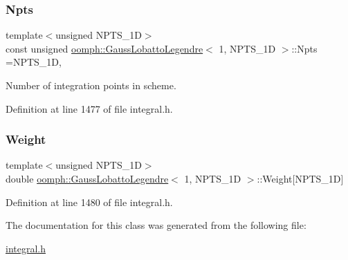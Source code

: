 \subsubsection{\texorpdfstring{Npts}{Npts}}
{\footnotesize\ttfamily template$<$unsigned N\+P\+T\+S\+\_\+1D$>$ \\
const unsigned \hyperlink{classoomph_1_1GaussLobattoLegendre}{oomph\+::\+Gauss\+Lobatto\+Legendre}$<$ 1, N\+P\+T\+S\+\_\+1D $>$\+::Npts =N\+P\+T\+S\+\_\+1D\hspace{0.3cm}{\ttfamily [static]}, {\ttfamily [private]}}



Number of integration points in scheme. 



Definition at line 1477 of file integral.\+h.

\mbox{\label{classoomph_1_1GaussLobattoLegendre_3_011_00_01NPTS__1D_01_4_a77ab182414338335497cd75903594306}} 
\subsubsection{\texorpdfstring{Weight}{Weight}}
{\footnotesize\ttfamily template$<$unsigned N\+P\+T\+S\+\_\+1D$>$ \\
double \hyperlink{classoomph_1_1GaussLobattoLegendre}{oomph\+::\+Gauss\+Lobatto\+Legendre}$<$ 1, N\+P\+T\+S\+\_\+1D $>$\+::Weight\mbox{[}N\+P\+T\+S\+\_\+1D\mbox{]}\hspace{0.3cm}{\ttfamily [private]}}



Definition at line 1480 of file integral.\+h.



The documentation for this class was generated from the following file\+:\begin{DoxyCompactItemize}
\item 
\hyperlink{integral_8h}{integral.\+h}\end{DoxyCompactItemize}

